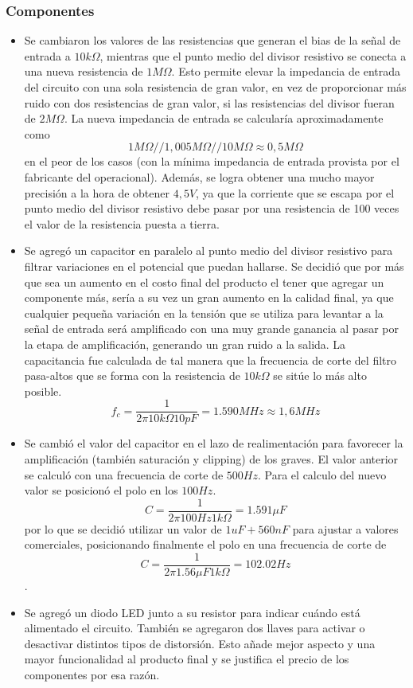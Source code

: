 \subsubsection{Componentes}
\begin{itemize}
\item Se cambiaron los valores de las resistencias que generan el bias de la señal de entrada a $10k\Omega$, mientras que el punto medio del divisor resistivo se conecta a una nueva resistencia de $1M\Omega$. Esto permite elevar la impedancia de entrada del circuito con una sola resistencia de gran valor, en vez de proporcionar más ruido con dos resistencias de gran valor, si las resistencias del divisor fueran de $2M\Omega$. La nueva impedancia de entrada se calcularía aproximadamente como $$ 1M\Omega//1,005M\Omega//10M\Omega \approx 0,5M\Omega$$ en el peor de los casos (con la mínima impedancia de entrada provista por el fabricante del operacional).
Además, se logra obtener una mucho mayor precisión a la hora de obtener $4,5V$, ya que la corriente que se escapa por el punto medio del divisor resistivo debe pasar por una resistencia de 100 veces el valor de la resistencia puesta a tierra.
\item Se agregó un capacitor en paralelo al punto medio del divisor resistivo para filtrar variaciones en el potencial que puedan hallarse. Se decidió que por más que sea un aumento en el costo final del producto el tener que agregar un componente más, sería a su vez un gran aumento en la calidad final, ya que cualquier pequeña variación en la tensión que se utiliza para levantar a la señal de entrada será amplificado con una muy grande ganancia al pasar por la etapa de amplificación, generando un gran ruido a la salida. La capacitancia fue calculada de tal manera que la frecuencia de corte del filtro pasa-altos que se forma con la resistencia de $10k\Omega$ se sitúe lo más alto posible. $$ f_c = \frac{1}{2\pi 10k\Omega 10pF} = 1.590MHz \approx 1,6MHz$$
\item Se cambió el valor del capacitor en el lazo de realimentación para favorecer la amplificación (también saturación y clipping) de los graves. El valor anterior se calculó con una frecuencia de corte de $500Hz$. Para el calculo del nuevo valor se posicionó el polo en los $100Hz$. $$C = \frac{1}{2\pi 100Hz 1k\Omega} = 1.591\mu F$$ por lo que se decidió utilizar un valor de $1uF + 560nF$ para ajustar a valores comerciales, posicionando finalmente el polo en una frecuencia de corte de  $$C = \frac{1}{2\pi 1.56\mu F 1k\Omega} = 102.02Hz$$.
\item Se agregó un diodo LED junto a su resistor para indicar cuándo está alimentado el circuito. También se agregaron dos llaves para activar o desactivar distintos tipos de distorsión. Esto añade mejor aspecto y una mayor funcionalidad al producto final y se justifica el precio de los componentes por esa razón.

\end{itemize}
